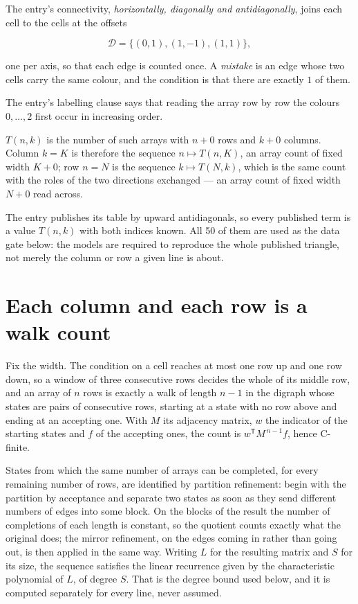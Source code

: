 \documentclass[11pt]{article}
\theoremstyle{definition}
\begin{document}
The entry's connectivity, {\itshape horizontally, diagonally and antidiagonally}, joins each cell to the cells at the offsets

\[\mathcal{D} = \{(0,1), (1,-1), (1,1)\},\]

one per axis, so that each edge is counted once. A {\itshape mistake} is an edge whose two cells carry the same colour, and the condition is that there are exactly $1$ of them.

The entry's labelling clause says that reading the array row by row the colours $0,\dots,2$ first occur in increasing order.

$T(n,k)$ is the number of such arrays with $n + 0$ rows and $k + 0$ columns. Column $k = K$ is therefore the sequence $n \mapsto T(n,K)$, an array count of fixed width $K + 0$; row $n = N$ is the sequence $k \mapsto T(N,k)$, which is the same count with the roles of the two directions exchanged --- an array count of fixed width $N + 0$ read across.

The entry publishes its table by upward antidiagonals, so every published term is a value $T(n,k)$ with both indices known. All 50 of them are used as the data gate below: the models are required to reproduce the whole published triangle, not merely the column or row a given line is about.

\section{Each column and each row is a walk count}

Fix the width. The condition on a cell reaches at most one row up and one row down, so a window of three consecutive rows decides the whole of its middle row, and an array of $n$ rows is exactly a walk of length $n-1$ in the digraph whose states are pairs of consecutive rows, starting at a state with no row above and ending at an accepting one. With $M$ its adjacency matrix, $w$ the indicator of the starting states and $f$ of the accepting ones, the count is $w^{\mathsf T}M^{\,n-1}f$, hence C-finite.

States from which the same number of arrays can be completed, for every remaining number of rows, are identified by partition refinement: begin with the partition by acceptance and separate two states as soon as they send different numbers of edges into some block. On the blocks of the result the number of completions of each length is constant, so the quotient counts exactly what the original does; the mirror refinement, on the edges coming in rather than going out, is then applied in the same way. Writing $L$ for the resulting matrix and $S$ for its size, the sequence satisfies the linear recurrence given by the characteristic polynomial of $L$, of degree $S$. That is the degree bound used below, and it is computed separately for every line, never assumed.
\end{document}
